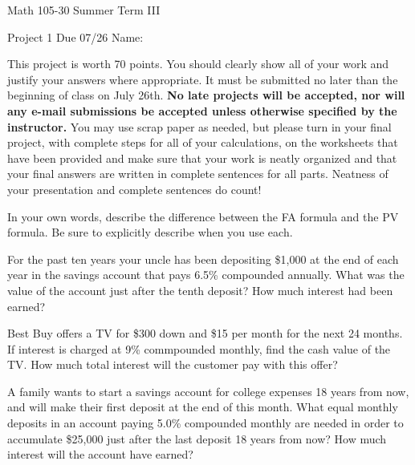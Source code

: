 \documentclass[11pt,epsfig]{article}
\begin{document}
Math 105-30 Summer Term III 

Project 1  Due 07/26\hspace{1in} {Name:} {\underline {\hspace{3.5in}}}
\vspace{2pc}

This project is worth 70 points. You should clearly show all of your work and justify your answers where appropriate. It must be submitted no later than the beginning of class on July 26th. \textbf{No late projects will be accepted, nor will any e-mail submissions be accepted unless otherwise specified by the instructor.} You may use scrap paper as needed, but please turn in your final project, with complete steps for all of your calculations, on the worksheets that have been provided and make sure that your work is neatly organized and that your final answers are written in complete sentences for all parts. Neatness of your presentation and complete sentences do count! \bigskip



\begin{problem}{14}
In your own words, describe the difference between the FA formula and the PV formula. Be sure to explicitly describe when you use each. 

\vfill
\end{problem}

\begin{problem}{14}
For the past ten years your uncle has been depositing \$1,000 at the end of each year in the savings account that pays 6.5\% compounded annually. What was the value of the account just after the tenth deposit? How much interest had been earned?

\vfill
\end{problem}

\newpage

\begin{problem}{14}
Best Buy offers a TV for \$300 down and \$15 per month for the next 24 months. If interest is charged at 9\% commpounded monthly, find the cash value of the TV. How much total interest will the customer pay with this offer?

\vfill
\end{problem}

\begin{problem}{14}
A family wants to start a savings account for college expenses 18 years from now, and will make their first deposit at the end of this month. What equal monthly deposits in an account paying 5.0\% compounded monthly are needed in order to accumulate \$25,000 just after the last deposit 18 years from now? How much interest will the account have earned?  

\vfill
\end{problem}
\end{document}
